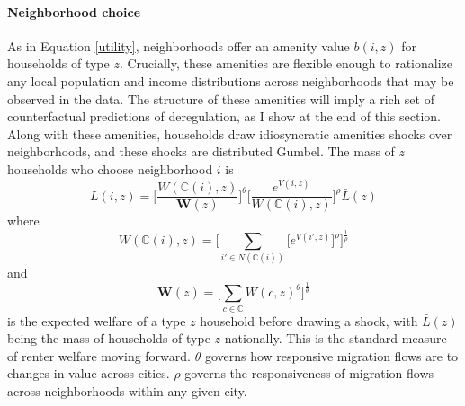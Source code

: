 \documentclass[12pt]{article}
\begin{document}
	\paragraph*{Neighborhood choice} 
	As in Equation \eqref{utility}, neighborhoods offer an amenity value $b(i, z)$ for households of type $z$. Crucially, these amenities are flexible enough to rationalize any local population and income distributions across neighborhoods that may be observed in the data. The structure of these amenities will imply a rich set of counterfactual predictions of deregulation, as I show at the end of this section. Along with these amenities, households draw idiosyncratic amenities shocks over neighborhoods, and these shocks are distributed Gumbel. The mass of $z$ households who choose neighborhood $i$ is 
	\begin{equation}\label{laboursupply}
	L(i, z) = \bigg[\frac{W(\mathbb{C}(i), z)}{\boldsymbol{W}(z)}\bigg]^{\theta}\bigg[\frac{e^{V(i, z)}}{W(\mathbb{C}(i), z)}\bigg]^{\rho}\bar{L}(z)
	\end{equation}
	where
	\begin{equation*}
	W(\mathbb{C}(i), z) = \bigg[\sum_{i' \in N(\mathbb{C}(i))}\big[e^{V(i', z)}\big]^{\rho}\bigg]^{\frac{1}{\rho}}
	\end{equation*} 
	and 
	\begin{equation}\label{Welfare}
		\boldsymbol{W}(z) = \bigg[\sum_{c \in \mathbb{C}} W(c, z)^{\theta}\bigg]^{\frac{1}{\theta}}	
	\end{equation}
	is the expected welfare of a type $z$ household before drawing a shock, with $\bar{L}(z)$ being the mass of households of type $z$ nationally.  This is the standard measure of renter welfare moving forward. $\theta$ governs how responsive migration flows are to changes in value across cities. $\rho$ governs the responsiveness of migration flows across neighborhoods within any given city. 
 
\end{document}
